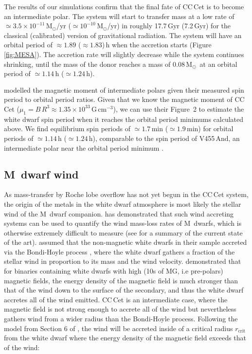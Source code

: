 \documentclass[fleqn,usenatbib]{mnras}
\newcommand{\Msun}{\mbox{$\mathrm{M}_{\odot}$}}
\begin{document}
The results of our simulations confirm that the final fate of CC\,Cet is to become an intermediate polar. The system will start to transfer mass at a low rate of $\simeq 3.5\times10^{-11}$\,\Msun/yr ($\simeq 10^{-10}$\,\Msun/yr) in roughly 17.7\,Gyr (7.2\,Gyr) for the classical (calibrated) version of gravitational radiation. The system will have an orbital period of $\approx 1.89$ ($\approx 1.83$)\,h when the accretion starts (Figure \ref{fig:MESA}). The accretion rate will slightly decrease while the system continues shrinking, until the mass of the donor reaches a mass of 0.08\,\Msun\ at an orbital period of $\simeq1.14$\,h ($\simeq1.24$\,h). 

\citet{nortonetal04-1} modelled the magnetic moment of intermediate polars given their measured  spin period to orbital period ratios. Given that we know the magnetic moment of CC\,Cet ($\mu_1 = B\,R^3 \approx1.35\times10^{33}$\,G\,cm$^{-3}$), we can use their Figure~2 to estimate the white dwarf spin period when it reaches the orbital period minimums calculated above. We find equilibrium spin periods of $\simeq1.7$\,min ($\simeq1.9$\,min) for orbital periods of $\simeq1.14$\,h ($\simeq1.24$\,h),  comparable to the spin period of V455\,And, an intermediate polar near the orbital period minimum \citep{araujo-betancoretal05-1, bloemenetal13-1}.



\subsection{M~dwarf wind}
\label{s:wind}

As mass-transfer by Roche lobe overflow has not yet begun in the CC\,Cet system, the origin of the metals in the white dwarf atmosphere is most likely the stellar wind of the M~dwarf companion. \citet{debes06-1} has demonstrated that such wind accreting systems can be used to quantify the wind mass-loss rates of M~dwarfs, which is otherwise extremely difficult to measure (see \citealt{woodetal21-1} for a summary of the current state of the art). \citet{debes06-1} assumed that the non-magnetic white dwarfs in their sample accreted via the Bondi-Hoyle process \citep{bondi+hoyle44-1}, where the white dwarf gathers a fraction of the stellar wind in proportion to its mass and the wind velocity. \citet{webbink+wickramasinghe05-1} demonstrated that for binaries containing white dwarfs with high (10s of MG, i.e pre-polars) magnetic fields, the energy density of the magnetic field is much stronger than that of the wind down to the surface of the secondary, and thus the white dwarf accretes all of the wind emitted. CC\,Cet is an intermediate case, where the magnetic field is not strong enough to accrete all of the wind but nevertheless gathers wind from a wider radius than the Bondi-Hoyle process. Following the model from Section 6 of \citet{webbink+wickramasinghe05-1}, the wind will be accreted inside of a critical radius $r_{\mathrm{crit}}$ from the white dwarf where the energy density of the magnetic field  exceeds that of the wind:
\end{document}
